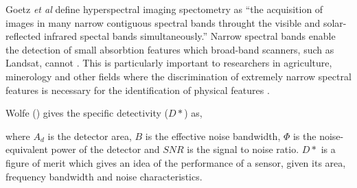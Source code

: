 


Goetz \emph{et al} \cite{Goetz1985} define hyperspectral imaging spectometry as ``the acquisition of images in many narrow contiguous spectral bands throught the visible and solar-reflected infrared spectal bands simultaneously.'' Narrow spectral bands enable the detection of small absorbtion features which broad-band scanners, such as Landsat, cannot \cite{Goetz1985}. This is particularly important to researchers in agriculture, minerology and other fields where the discrimination of extremely narrow spectral features is necessary for the identification of physical features \cite{Goetz1985}. 

Wolfe (\cite{Wolfe1997}) gives the specific detectivity ($D*$) as,


where $A_d$ is the detector area, $B$ is the effective noise bandwidth, $\Phi$ is the noise-equivalent power of the detector and $SNR$ is the signal to noise ratio. $D*$ is a figure of merit which gives an idea of the performance of a sensor, given its area, frequency bandwidth and noise characteristics. 

